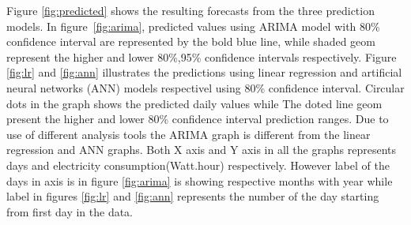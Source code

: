 Figure \ref{fig:predicted} shows the resulting forecasts from the three prediction models. In figure~\ref{fig:arima}, predicted values using ARIMA model with 80\% confidence interval  are represented by the bold blue line, while shaded geom represent the higher and lower 80\%,95\% confidence intervals respectively. Figure \ref{fig:lr} and \ref{fig:ann} illustrates the predictions using linear regression and artificial neural networks (ANN) models respectivel using 80\% confidence interval. Circular dots in the graph shows the predicted daily values while The doted line geom present the higher and lower 80\% confidence interval prediction ranges. Due to use of different analysis tools the ARIMA graph is different from the linear regression and ANN graphs. Both X axis and Y axis in all the graphs represents days and electricity consumption(Watt.hour) respectively. However label of the days in axis is in figure \ref{fig:arima} is showing respective months with year while label in figures \ref{fig:lr} and \ref{fig:ann} represents the number of the day starting from first day in the data.  
 \\
